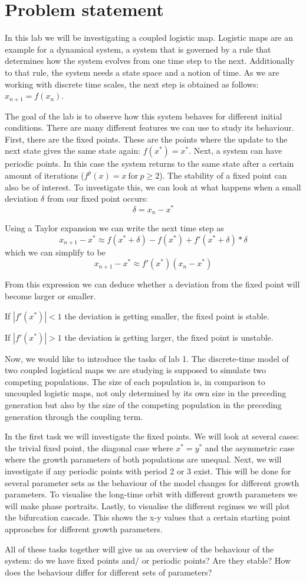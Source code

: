 \section{Problem statement \cite{Lecture}}
In this lab we will be investigating a coupled logistic map. Logistic maps are an example for a dynamical system, a system that is governed by a rule that determines how 
the system evolves from one time step to the next. Additionally to that rule, the system needs a state space and a notion of time. As we are working with discrete time scales, 
the next step is obtained as follows: $x_{n+1}=f(x_n)$.

The goal of the lab is to observe how this system behaves for different initial conditions. There are many different features we can use to study its behaviour. First, there are the 
fixed points. These are the points where the update to the next state gives the same state again: $f(x^*) = x^*$. Next, a system can have periodic points. In this case the system 
returns to the same state after a certain amount of iterations ($f^p(x) = x \  \mathrm{for} \ p \ge 2$). The stability of a fixed point can also be of interest. To investigate this, 
we can look at what happens when a small deviation $\delta$ from our fixed point occurs: 
$$
\delta = x_n - x^*
$$

Using a Taylor expansion we can write the next time step as 
$$
x_{n+1} - x^* \approx f(x^*+\delta) - f(x^*) + f'(x^*+\delta)*\delta 
$$
which we can simplify to be 
$$
x_{n+1} - x^* \approx f'(x^*)(x_n -x^*)
$$

From this expression we can deduce whether a deviation from the fixed point will become larger or smaller.

If $|f'(x^*)| < 1$ the deviation is getting smaller, the fixed point is stable.

If $|f'(x^*)| > 1$ the deviation is getting larger, the fixed point is unstable.

Now, we would like to introduce the tasks of lab 1. The discrete-time model of two coupled logistical maps we are studying is supposed to simulate two competing 
populations. The size of each population is, in comparison to uncoupled logistic maps, not only determined by its own size in the preceding generation but also by the size of the competing population in the 
preceding generation through the coupling term.

In the first task we will investigate the fixed points. We will look at several cases: the trivial fixed point, the diagonal case where $x^*=y^*$ and the asymmetric case where the growth parameters of both 
populations are unequal. Next, we will investigate if any periodic points with period 2 or 3 exist. This will be done for several parameter sets as the behaviour of the 
model changes for different growth parameters. To visualise the long-time orbit with different growth parameters we will make phase portraits. Lastly, to visualise the 
different regimes we will plot the bifurcation cascade. This shows the x-y values that a certain starting point approaches for different growth parameters.

All of these tasks together will give us an overview of the behaviour of the system: do we have fixed points and/ or periodic points? Are they stable? How does the behaviour 
differ for different sets of parameters?
